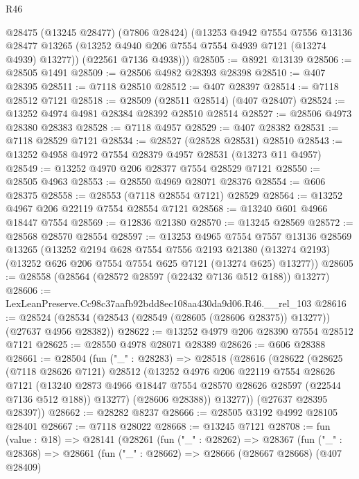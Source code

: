 \begin{lexlean}{R46}
\begin{coremodule}
      @28475
        (@13245 @28477)
        (@7806 @28424)
        (@13253
          @4942
          @7554
          @7556
          @13136
          @28477
          @13265
          (@13252 @4940 @206 @7554 @7554 @4939 @7121 (@13274 @4939) @13277))
        (@22561 @7136 @4938)))
@28505 := @8921 @13139
@28506 := @28505 @1491
@28509 := @28506 @4982 @28393 @28398
@28510 := @407 @28395
@28511 := @7118 @28510
@28512 := @407 @28397
@28514 := @7118 @28512 @7121
@28518 := @28509 (@28511 @28514) (@407 @28407)
@28524 := @13252 @4974 @4981 @28384 @28392 @28510 @28514
@28527 := @28506 @4973 @28380 @28383
@28528 := @7118 @4957
@28529 := @407 @28382
@28531 := @7118 @28529 @7121
@28534 := @28527 (@28528 @28531) @28510
@28543 := @13252 @4958 @4972 @7554 @28379 @4957 @28531 (@13273 @11 @4957)
@28549 := @13252 @4970 @206 @28377 @7554 @28529 @7121
@28550 := @28505 @4963
@28553 := @28550 @4969 @28071 @28376
@28554 := @606 @28375
@28558 := @28553 (@7118 @28554 @7121) @28529
@28564 := @13252 @4967 @206 @22119 @7554 @28554 @7121
@28568 := @13240 @601 @4966 @18447 @7554
@28569 := @12836 @21380
@28570 := @13245 @28569
@28572 := @28568 @28570 @28554
@28597 := @13253
    @4965
    @7554
    @7557
    @13136
    @28569
    @13265
    (@13252
      @2194
      @628
      @7554
      @7556
      @2193
      @21380
      (@13274 @2193)
      (@13252 @626 @206 @7554 @7554 @625 @7121 (@13274 @625) @13277))
@28605 := @28558 (@28564 (@28572 @28597 (@22432 @7136 @512 @188)) @13277)
@28606 := LexLeanPreserve.Cc98c37aafb92bdd8ec108aa430da9d06.R46.__rel_103
@28616 := @28524 (@28534 (@28543 (@28549 (@28605 (@28606 @28375)) @13277)) (@27637 @4956 @28382))
@28622 := @13252 @4979 @206 @28390 @7554 @28512 @7121
@28625 := @28550 @4978 @28071 @28389
@28626 := @606 @28388
@28661 := @28504
    (fun ("_" : @28283) =>
    @28518
      (@28616
        (@28622
          (@28625
            (@7118 @28626 @7121)
            @28512
            (@13252
              @4976
              @206
              @22119
              @7554
              @28626
              @7121
              (@13240 @2873 @4966 @18447 @7554 @28570 @28626 @28597 (@22544 @7136 @512 @188))
              @13277)
            (@28606 @28388))
          @13277))
      (@27637 @28395 @28397))
@28662 := @28282 @8237
@28666 := @28505 @3192 @4992 @28105 @28401
@28667 := @7118 @28022
@28668 := @13245 @7121
@28708 := fun (value : @18) =>
  @28141
    (@28261
      (fun ("_" : @28262) =>
      @28367
        (fun ("_" : @28368) =>
        @28661
          (fun ("_" : @28662) =>
          @28666
            (@28667 @28668)
            (@407 @28409)

\end{coremodule}
\end{lexlean}
